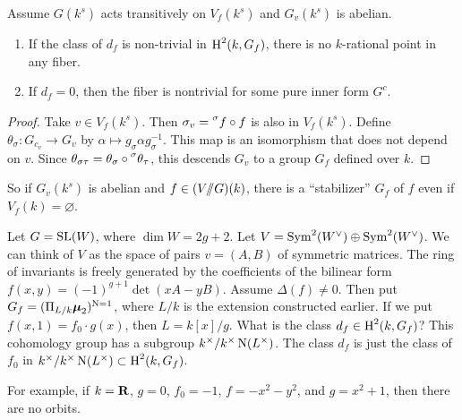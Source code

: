 \begin{principle}
Assume $G(k^s)$ acts transitively on $V_f(k^s)$ and $G_v(k^s)$ is abelian. 
\begin{enumerate}
  \item If the class of $d_f$ is non-trivial in $\operatorname{H}^2(k,G_f)$, there is no 
    $k$-rational point in any fiber. 
  \item If $d_f=0$, then the fiber is nontrivial for some pure inner form $G^c$. 
\end{enumerate}
\end{principle}
\begin{proof}
Take $v\in V_f(k^s)$. Then $\sigma_v = \prescript{\sigma}{}{f}\circ f$ is also 
in $V_f(k^s)$. Define $\theta_\sigma:G_{c_v} \to G_v$ by 
$\alpha\mapsto g_\sigma \alpha g_\sigma^{-1}$. This map is an isomorphism that 
does not depend on $v$. Since 
$\theta_{\sigma\tau} = \theta_\sigma\circ\prescript{\sigma}{}{\theta_\tau}$, 
this descends $G_v$ to a group $G_f$ defined over $k$. 
\end{proof}

So if $G_v(k^s)$ is abelian and $f\in (V/\!\!/ G)(k)$, there is a ``stabilizer'' 
$G_f$ of $f$ even if $V_f(k)=\varnothing$. 

\begin{example}
Let $G=\operatorname{SL}(W)$, where $\dim W=2 g+2$. Let 
$V=\operatorname{Sym}^2(W^\vee)\oplus \operatorname{Sym}^2(W^\vee)$. We can think of 
$V$ as the space of pairs $v=(A,B)$ of symmetric matrices. The ring of 
invariants is freely generated by the coefficients of the bilinear form 
$f(x,y) = (-1)^{g+1}\det(x A-y B)$. Assume $\Delta(f)\ne 0$. Then put 
$G_f=(\Pi_{L/k}\boldsymbol\mu_2)^{\operatorname{N}=1}$, where $L/k$ is the extension 
constructed earlier. If we put $f(x,1) = f_0 \cdot g(x)$, then 
$L=k[x]/g$. What is the class $d_f\in \operatorname{H}^2(k,G_f)$? This cohomology group 
has a subgroup $k^\times / k^\times \operatorname{N}(L^\times)$. The class $d_f$ is just 
the class of $f_0$ in $k^\times / k^\times \operatorname{N}(L^\times)\subset \operatorname{H}^2(k,G_f)$. 
\end{example}

For example, if $k=\mathbf{R}$, $g=0$, $f_0=-1$, $f=-x^2-y^2$, and $g=x^2+1$, then there 
are no orbits. 





